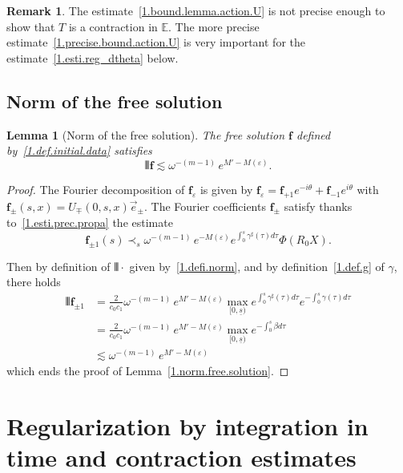 \documentclass[10pt]{amsart}
\newtheorem{lemm}[cdrthm]{Lemma}
\theoremstyle{definition}
\newtheorem{rema}[cdrthm]{Remark}
\theoremstyle{plain}
\newcommand*\e{\varepsilon}
\newcommand*\EE{{\mathbb E}}
\newcommand*\g{\gamma}
\newcommand*\f{{\mathbf f}}
\newcommand*\dsp{\displaystyle}
\newcommand*\und{\underline}
\DeclarePairedDelimiter{\VERT}{|\mkern -1.6mu|\mkern -1.6mu|}{|\mkern -1.6mu|\mkern -1.6mu|}
\begin{document}
\begin{rema}
The estimate~\eqref{1.bound.lemma.action.U} is not precise enough to show that $T$ is a contraction in $\EE$. The more precise estimate~\eqref{1.precise.bound.action.U} is very important for the estimate~\eqref{1.esti.reg_dtheta} below.
\end{rema}



\subsection{Norm of the free solution}

\begin{lemm}[Norm of the free solution]\label{1.lemma.norm.free.solution}
The free solution $\f$ defined by~\eqref{1.def.initial.data} satisfies
\begin{equation}\label{1.norm.free.solution}
\VERT{\f} \lesssim \omega^{-(m-1)}\,e^{M'-M(\e)}.
\end{equation}
\end{lemm}

\begin{proof}
The Fourier decomposition of $\f_{\e}$ is given by $\f_{\e} = \f_{+1}e^{-i\theta} + \f_{-1}e^{i\theta}$ with $ \f_{\pm}(s,x) = U_{\mp}(0,s,x)\vec{e}_{\pm} $. The Fourier coefficients $\f_{\pm}$ satisfy thanks to~\eqref{1.esti.prec.propa} the estimate
\begin{equation}\label{1.estimate.f.pm1}
\f_{\pm 1}(s) \prec_{s} \omega^{-(m-1)}\,e^{-M(\e)}e^{ \int_{0}^{s} \g^{\sharp}(\tau) d\tau } \Phi(R_0 X).
\end{equation}


Then by definition of $\VERT{\cdot}$ given by~\eqref{1.defi.norm}, and by definition~\eqref{1.def.g} of $\g$, there holds
\begin{align*}
\VERT{\f_{\pm 1}} & = \frac{\dsp 2}{\dsp c_0c_1} \omega^{-(m-1)}\,e^{M'-M(\e)} \max_{[0,\und{s})} e^{ \int_{0}^{s} \g^{\sharp}(\tau) d\tau}e^{- \int_{0}^{s} \g(\tau) d\tau} \\
& = \frac{\dsp 2}{\dsp c_0c_1} \omega^{-(m-1)}\,e^{M'-M(\e)} \max_{[0,\und{s})} e^{- \int_{0}^{s} \beta d\tau} \\
& \lesssim \omega^{-(m-1)}\,e^{M'-M(\e)}
\end{align*}
which ends the proof of Lemma~\ref{1.norm.free.solution}.
\end{proof}



\section{Regularization by integration in time and contraction estimates}\label{1.section.contraction}
\end{document}
